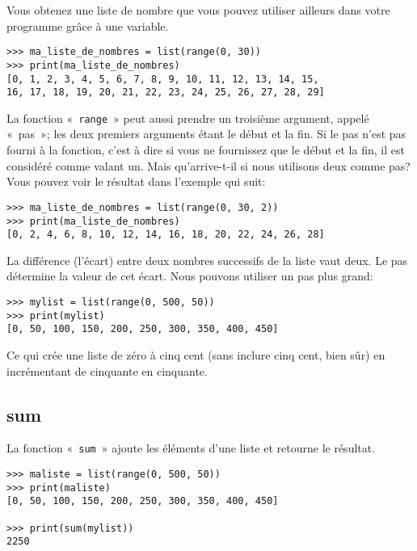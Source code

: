 Vous obtenez une liste de nombre que vous pouvez utiliser ailleurs dans votre programme grâce à une variable.

\begin{Verbatim}[frame=single,rulecolor=\color{gray}]
>>> ma_liste_de_nombres = list(range(0, 30))
>>> print(ma_liste_de_nombres)
[0, 1, 2, 3, 4, 5, 6, 7, 8, 9, 10, 11, 12, 13, 14, 15, 
16, 17, 18, 19, 20, 21, 22, 23, 24, 25, 26, 27, 28, 29]
\end{Verbatim}

La fonction «~\texttt{range}~» peut aussi prendre un troisième argument, appelé «~pas~»; les deux premiers arguments étant le début et la fin.
Si le pas n'est pas fourni à la fonction, c'est à dire si vous ne fournissez que le début et la fin, il est considéré comme valant un. Mais qu'arrive-t-il si nous utilisons deux comme pas? Vous pouvez voir le résultat dans l'exemple qui suit:
\begin{Verbatim}[frame=single,rulecolor=\color{gray}]
>>> ma_liste_de_nombres = list(range(0, 30, 2))
>>> print(ma_liste_de_nombres)
[0, 2, 4, 6, 8, 10, 12, 14, 16, 18, 20, 22, 24, 26, 28]
\end{Verbatim}

La différence (l'écart) entre deux nombres successifs de la liste vaut deux. Le pas détermine la valeur de cet écart. Nous pouvons utiliser un pas plus grand:
\begin{Verbatim}[frame=single,rulecolor=\color{gray}]
>>> mylist = list(range(0, 500, 50))
>>> print(mylist)
[0, 50, 100, 150, 200, 250, 300, 350, 400, 450]
\end{Verbatim}

Ce qui crée une liste de zéro à cinq cent (sans inclure cinq cent, bien sûr) en incrémentant de cinquante en cinquante.

\subsection*{sum}

La fonction «~\texttt{sum}~» ajoute les éléments d'une liste et retourne le résultat.
\begin{Verbatim}[frame=single,rulecolor=\color{gray}]
>>> maliste = list(range(0, 500, 50))
>>> print(maliste)
[0, 50, 100, 150, 200, 250, 300, 350, 400, 450]

>>> print(sum(mylist))
2250
\end{Verbatim}

\newpage
